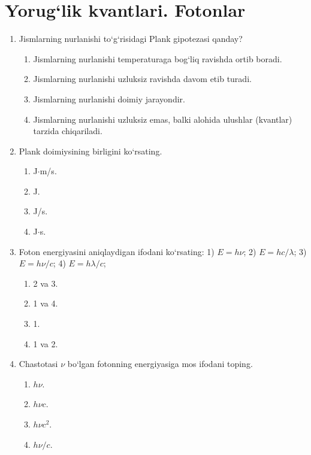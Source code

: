 \section{Yorug‘lik kvantlari. Fotonlar}



\begin{enumerate}

\item Jismlarning nurlanishi to‘g‘risidagi Plank gipotezasi qanday?
\begin{enumerate}[label=\Alph*)]
\item Jismlarning nurlanishi temperaturaga bog‘liq ravishda ortib boradi.
\item Jismlarning nurlanishi uzluksiz ravishda davom etib turadi.
\item Jismlarning nurlanishi doimiy jarayondir.
\item Jismlarning nurlanishi uzluksiz emas, balki alohida ulushlar (kvantlar) tarzida chiqariladi.
\end{enumerate}

\item Plank doimiysining birligini ko‘rsating.
\begin{enumerate}[label=\Alph*)]
\item J$\cdot$m/s.
\item J.
\item J/s.
\item J$\cdot$s.
\end{enumerate}

\item Foton energiyasini aniqlaydigan ifodani ko‘rsating:
1) $E = h\nu$; 2) $E = hc/\lambda$; 3) $E = h\nu/c$; 4) $E = h\lambda/c$;
\begin{enumerate}[label=\Alph*)]
\item 2 va 3.
\item 1 va 4.
\item 1.
\item 1 va 2.
\end{enumerate}

\item Chastotasi $\nu$ bo‘lgan fotonning energiyasiga mos ifodani toping.
\begin{enumerate}[label=\Alph*)]
\item $h\nu$.
\item $h\nu c$.
\item $h\nu c^2$.
\item $h\nu/c$.
\end{enumerate}


\end{enumerate}
